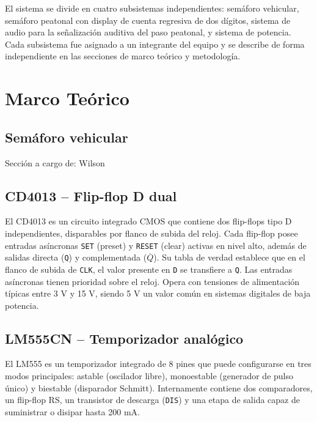 \documentclass[journal]{IEEEtran}
\begin{document}
El sistema se divide en cuatro subsistemas independientes: semáforo vehicular, semáforo
peatonal con display de cuenta regresiva de dos dígitos, sistema de audio para la
señalización auditiva del paso peatonal, y sistema de potencia. Cada subsistema fue
asignado a un integrante del equipo y se describe de forma independiente en las secciones
de marco teórico y metodología.

\section{Marco Teórico}

\subsection{Semáforo vehicular}
Sección a cargo de: Wilson
\subsection{CD4013 – Flip-flop D dual}

El CD4013 es un circuito integrado CMOS que contiene dos flip-flops tipo D independientes, disparables por flanco de subida del reloj. Cada flip-flop posee entradas asíncronas \texttt{SET} (preset) y \texttt{RESET} (clear) activas en nivel alto, además de salidas directa (\texttt{Q}) y complementada (\texttt{$\overline{Q}$}). Su tabla de verdad establece que en el flanco de subida de \texttt{CLK}, el valor presente en \texttt{D} se transfiere a \texttt{Q}. Las entradas asíncronas tienen prioridad sobre el reloj. Opera con tensiones de alimentación típicas entre 3 V y 15 V, siendo 5 V un valor común en sistemas digitales de baja potencia.

\subsection{LM555CN – Temporizador analógico}

El LM555 es un temporizador integrado de 8 pines que puede configurarse en tres modos principales: astable (oscilador libre), monoestable (generador de pulso único) y biestable (disparador Schmitt). Internamente contiene dos comparadores, un flip-flop RS, un transistor de descarga (\texttt{DIS}) y una etapa de salida capaz de suministrar o disipar hasta 200 mA.
\end{document}
